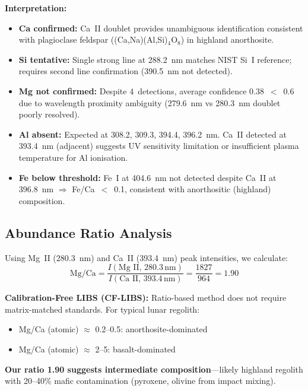 \documentclass[a4paper,twocolumn,10pt]{article}
\begin{document}
\textbf{Interpretation:}
\begin{itemize}[nosep,leftmargin=*]
  \item \textbf{Ca confirmed:} Ca~II doublet provides unambiguous
    identification consistent with plagioclase feldspar
    ((Ca,Na)(Al,Si)$_4$O$_8$) in highland anorthosite.

  \item \textbf{Si tentative:} Single strong line at 288.2~nm matches
    NIST Si~I reference; requires second line confirmation (390.5~nm
    not detected).

  \item \textbf{Mg not confirmed:} Despite 4~detections, average
    confidence 0.38~$<$~0.6 due to wavelength proximity ambiguity
    (279.6~nm vs 280.3~nm doublet poorly resolved).

  \item \textbf{Al absent:} Expected at 308.2, 309.3, 394.4, 396.2~nm.
    Ca~II detected at 393.4~nm (adjacent) suggests UV sensitivity
    limitation or insufficient plasma temperature for Al ionisation.

  \item \textbf{Fe below threshold:} Fe~I at 404.6~nm not detected
    despite Ca~II at 396.8~nm $\Rightarrow$ Fe/Ca~$<$~0.1, consistent
    with anorthositic (highland) composition.
\end{itemize}

\subsection{Abundance Ratio Analysis}

Using Mg~II (280.3~nm) and Ca~II (393.4~nm) peak intensities, we
calculate:
\begin{equation}
\text{Mg/Ca} = \frac{I(\text{Mg~II},\,280.3\,\text{nm})}
                    {I(\text{Ca~II},\,393.4\,\text{nm})}
              = \frac{1827}{964} = 1.90
\end{equation}

\textbf{Calibration-Free LIBS (CF-LIBS):} Ratio-based method does not
require matrix-matched standards. For typical lunar regolith:
\begin{itemize}[nosep,leftmargin=*]
  \item Mg/Ca (atomic) $\approx$ 0.2--0.5: anorthosite-dominated
  \item Mg/Ca (atomic) $\approx$ 2--5: basalt-dominated
\end{itemize}

\textbf{Our ratio 1.90 suggests intermediate composition}---likely
highland regolith with 20--40\% mafic contamination (pyroxene, olivine
from impact mixing).
\end{document}
